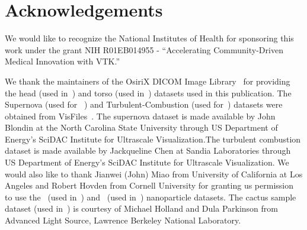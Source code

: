 \section{Acknowledgements}
\label{acknowledgements}
We would like to recognize the National Institutes of Health for sponsoring this
work under the grant NIH R01EB014955 - ``Accelerating Community-Driven Medical
Innovation with VTK.'' 

We thank the maintainers of the OsiriX DICOM Image
Library~\citep{osirix_osirix_2017} for providing the head (used
in~) and torso (used in~) datasets used in this publication. The
Supernova (used for ~) and Turbulent-Combustion (used
for~) datasets were obtained from
VisFiles~\citep{visfiles_visfiles_2007}. The supernova dataset is made available
by John Blondin at the North Carolina State University through US Department
of Energy's SciDAC Institute for Ultrascale Visualization.The turbulent
combustion dataset is made available by Jackqueline Chen at Sandia
Laboratories through US Department of Energy's SciDAC Institute for Ultrascale
Visualization. We would also like to thank Jianwei (John) Miao from University
of California at Los Angeles and Robert Hovden from Cornell University for
granting us permission to use the~ (used in~)
and~ (used in~) nanoparticle datasets. The
cactus sample dataset (used in~) is courtesy of Michael
Holland and Dula Parkinson from Advanced Light Source, Lawrence Berkeley National
Laboratory.
